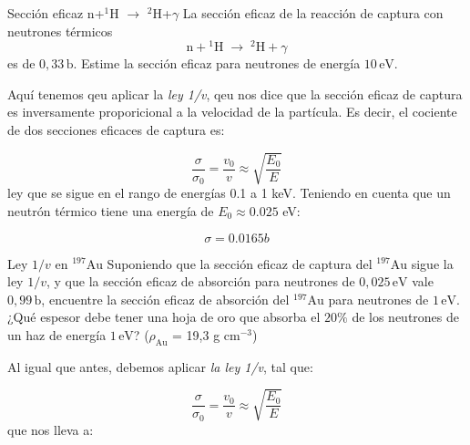 \begin{Ejercicio}{Sección eficaz n+$^{1}$H $\to$ $^{2}$H+$\gamma$}\label{Ej:10}
La sección eficaz de la reacción de captura con neutrones térmicos
\[
\mathrm{n} + {}^{1}\mathrm{H} \;\to\; {}^{2}\mathrm{H} + \gamma
\]
es de $0{,}33\,\mathrm{b}$. Estime la sección eficaz para neutrones de energía $10\,\mathrm{eV}$.
\end{Ejercicio}


Aquí tenemos qeu aplicar la \textit{ley 1/v}, qeu nos dice que la sección eficaz de captura es inversamente proporicional a la velocidad de la partícula. Es decir, el cociente de dos secciones eficaces de captura es: 

\begin{equation}
    \frac{\sigma}{\sigma_0} = \frac{v_0}{v} \approx \sqrt{\frac{E_0}{E}}
\end{equation}
ley que se sigue en el rango de energías 0.1 a 1 keV. Teniendo en cuenta que un neutrón térmico tiene una energía de $E_0\approx 0.025$ eV:

\begin{equation}
    \sigma = 0.0165 \unit{b}
\end{equation}


\begin{Ejercicio}{Ley $1/v$ en ${}^{197}\mathrm{Au}$}\label{Ej:11}
Suponiendo que la sección eficaz de captura del ${}^{197}\mathrm{Au}$ sigue la ley $1/v$, y que la sección eficaz de absorción para neutrones de $0{,}025\,\mathrm{eV}$ vale $0{,}99\,\mathrm{b}$, 
encuentre la sección eficaz de absorción del ${}^{197}\mathrm{Au}$ para neutrones de $1\,\mathrm{eV}$. 
¿Qué espesor debe tener una hoja de oro que absorba el $20\%$ de los neutrones de un haz de energía $1\,\mathrm{eV}$? ($\rho_\text{Au}$ = 19,3 g cm$^{-3}$)
\end{Ejercicio} 

Al igual que antes, debemos aplicar  \textit{la ley 1/v}, tal que: 

\begin{equation}
    \frac{\sigma}{\sigma_0} = \frac{v_0}{v} \approx \sqrt{\frac{E_0}{E}} 
\end{equation}
que nos lleva a: 

